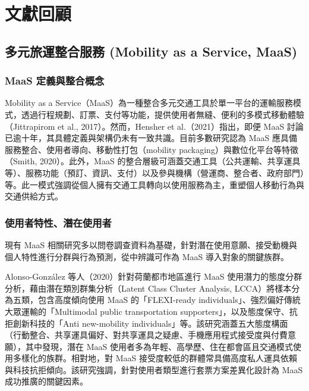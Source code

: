 
\providecommand{\tightlist}{%
  \setlength{\itemsep}{0pt}\setlength{\parskip}{0pt}
}

\chapter{文獻回顧}\label{ux6587ux737bux56deux9867}

\section{多元旅運整合服務 (Mobility as a Service,
MaaS)}\label{ux591aux5143ux65c5ux904bux6574ux5408ux670dux52d9-mobility-as-a-service-maas}

\subsection{MaaS
定義與整合概念}\label{maas-ux5b9aux7fa9ux8207ux6574ux5408ux6982ux5ff5}

Mobility as a
Service（MaaS）為一種整合多元交通工具於單一平台的運輸服務模式，透過行程規劃、訂票、支付等功能，提供使用者無縫、便利的多模式移動體驗（Jittrapirom
et al., 2017）。然而，Hensher et al.（2021）指出，即便 MaaS
討論已逾十年，其具體定義與架構仍未有一致共識。目前多數研究認為 MaaS
應具備服務整合、使用者導向、移動性打包（mobility
packaging）與數位化平台等特徵（Smith, 2020）。此外，MaaS
的整合層級可涵蓋交通工具（公共運輸、共享運具等）、服務功能（預訂、資訊、支付）以及參與機構（營運商、整合者、政府部門）等。此一模式強調從個人擁有交通工具轉向以使用服務為主，重塑個人移動行為與交通供給方式。

\subsection{使用者特性、潛在使用者}\label{ux4f7fux7528ux8005ux7279ux6027ux6f5bux5728ux4f7fux7528ux8005}

現有 MaaS
相關研究多以問卷調查資料為基礎，針對潛在使用意願、接受動機與個人特性進行分群與行為預測，從中辨識可作為
MaaS 導入對象的關鍵族群。

Alonso-González 等人（2020）針對荷蘭都市地區進行 MaaS
使用潛力的態度分群分析，藉由潛在類別群集分析（Latent Class Cluster
Analysis, LCCA）將樣本分為五類，包含高度傾向使用 MaaS 的「FLEXI-ready
individuals」、強烈偏好傳統大眾運輸的「Multimodal public transportation
supporters」，以及態度保守、抗拒創新科技的「Anti new-mobility
individuals」等。該研究涵蓋五大態度構面（行動整合、共享運具偏好、對共享運具之疑慮、手機應用程式接受度與付費意願），其中發現，潛在
MaaS
使用者多為年輕、高學歷、住在都會區且交通模式使用多樣化的族群。相對地，對
MaaS
接受度較低的群體常具備高度私人運具依賴與科技抗拒傾向。該研究強調，針對使用者類型進行套票方案差異化設計為
MaaS 成功推廣的關鍵因素。

